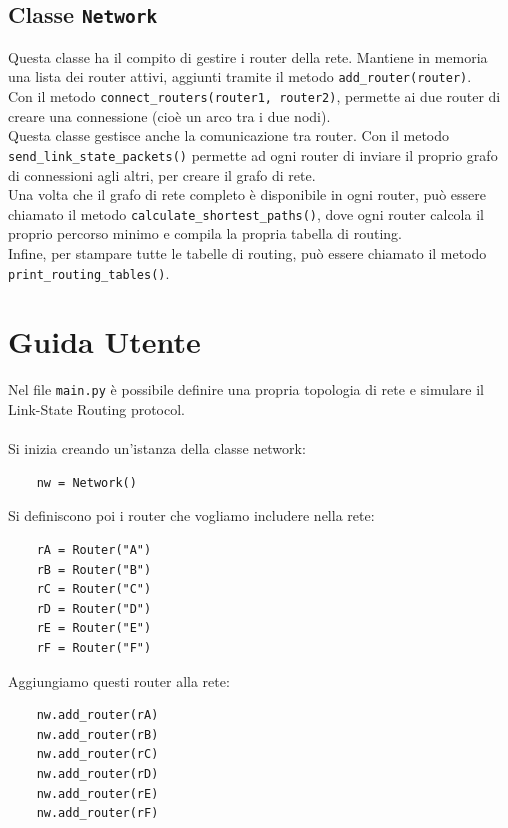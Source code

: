 \documentclass{article}
\begin{document}
\subsection{Classe \texttt{Network}}
Questa classe ha il compito di gestire i router della rete. Mantiene in memoria una lista dei router attivi, aggiunti tramite il metodo \texttt{add\_router(router)}.\\
Con il metodo \texttt{connect\_routers(router1, router2)}, permette ai due router di creare una connessione (cioè un arco tra i due nodi).\\
Questa classe gestisce anche la comunicazione tra router. Con il metodo \texttt{send\_link\_state\_packets()} permette ad ogni router di inviare il proprio grafo di connessioni agli altri, per creare il grafo di rete.\\
Una volta che il grafo di rete completo è disponibile in ogni router, può essere chiamato il metodo \texttt{calculate\_shortest\_paths()}, dove ogni router calcola il proprio percorso minimo e compila la propria tabella di routing.\\
Infine, per stampare tutte le tabelle di routing, può essere chiamato il metodo \texttt{print\_routing\_tables()}.

\newpage

\section{Guida Utente}
Nel file \texttt{main.py} è possibile definire una propria topologia di rete e simulare il Link-State Routing protocol.\\
\\
Si inizia creando un'istanza della classe network:

\begin{lstlisting}
    nw = Network()
\end{lstlisting}

Si definiscono poi i router che vogliamo includere nella rete:
\begin{lstlisting}
    rA = Router("A")
    rB = Router("B")
    rC = Router("C")
    rD = Router("D")
    rE = Router("E")
    rF = Router("F")
\end{lstlisting}

Aggiungiamo questi router alla rete:
\begin{lstlisting}
    nw.add_router(rA)
    nw.add_router(rB)
    nw.add_router(rC)
    nw.add_router(rD)
    nw.add_router(rE)
    nw.add_router(rF)
\end{lstlisting}
\end{document}

